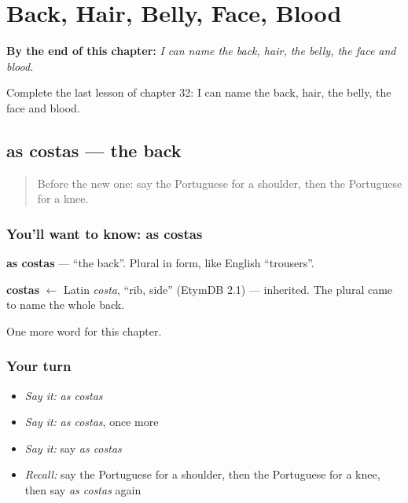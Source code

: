 
\chapter{Back, Hair, Belly, Face, Blood}
\label{ch:pt-back-hair-belly-face-blood}

\begin{chapteropening}
\textbf{By the end of this chapter:} \emph{I can name the back, hair, the belly, the face and blood.}

Complete the last lesson of chapter 32: I can name the back, hair, the belly, the face and blood.
\end{chapteropening}

\section[as costas]{as costas — the back}

\label{lesson:PT-C32-costas}



\begin{quote}
Before the new one: say the Portuguese for a shoulder, then the Portuguese for a knee.
\end{quote}

\subsection*{You'll want to know: as costas}
\textbf{as costas} — \textquotedblleft{}the back\textquotedblright{}. Plural in form, like English \textquotedblleft{}trousers\textquotedblright{}.

\begin{cousinweb}
\textbf{costas} $\leftarrow$ Latin \emph{costa}, \textquotedblleft{}rib, side\textquotedblright{} (EtymDB 2.1) — inherited. The plural came to name the whole back.
\end{cousinweb}

\begin{grammarlens}[title={What you've built}]
One more word for this chapter.
\end{grammarlens}

\subsection*{Your turn}
\begin{itemize}
\raggedright
  \item \emph{Say it:} \emph{as costas}
  \item \emph{Say it:} \emph{as costas}, once more
  \item \emph{Say it:} say \emph{as costas}
  \item \emph{Recall:} say the Portuguese for a shoulder, then the Portuguese for a knee, then say \emph{as costas} again
\end{itemize}

